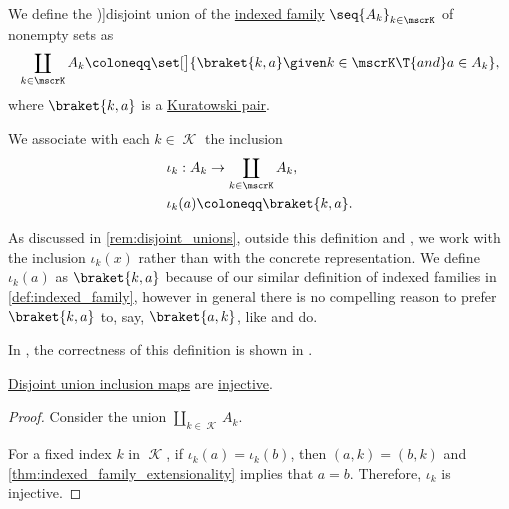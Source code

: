 \begin{definition}\label{def:disjoint_union}
  We define the \term[ru=дизъюнктное произведение, en=disjoint union (\cite[198]{Knapp2016BasicAlgebra})]{disjoint union} of the \hyperref[def:indexed_family]{indexed family} \( \seq{ A_k }_{k \in \mscrK} \) of nonempty sets as
  \begin{equation*}
    \coprod_{k \in \mscrK} A_k \coloneqq \set[\big]{ \braket{ k, a } \given k \in \mscrK \T{and} a \in A_k },
  \end{equation*}
  where \( \braket{ k, a } \) is a \hyperref[def:kuratowski_pair]{Kuratowski pair}.

  We associate with each \( k \in \mscrK \) the inclusion
  \begin{equation*}
    \begin{aligned}
      &\iota_k: A_k \to \coprod_{k \in \mscrK} A_k, \\
      &\iota_k(a) \coloneqq \braket{ k, a }.
    \end{aligned}
  \end{equation*}
\end{definition}
\begin{comments}
  \item As discussed in \cref{rem:disjoint_unions}, outside this definition and , we work with the inclusion \( \iota_k(x) \) rather than with the concrete representation. We define \( \iota_k(a) \) as \( \braket{ k, a } \) because of our similar definition of indexed families in \cref{def:indexed_family}, however in general there is no compelling reason to prefer \( \braket{ k, a } \) to, say, \( \braket{ a, k } \), like \cite[19]{Хелемский2014ФункциональныйАнализ} and \cite[198]{Knapp2016BasicAlgebra} do.

  \item In \hyperref[def:zfc]{}, the correctness of this definition is shown in .
\end{comments}

\begin{proposition}\label{thm:disjoint_product_inclusions_injective}
  \hyperref[def:disjoint_union]{Disjoint union inclusion maps} are \hyperref[def:function_invertibility/injective]{injective}.
\end{proposition}
\begin{proof}
  Consider the union \( \coprod_{k \in \mscrK} A_k \).

  For a fixed index \( k \) in \( \mscrK \), if \( \iota_k(a) = \iota_k(b) \), then \( (a, k) = (b, k) \) and \cref{thm:indexed_family_extensionality} implies that \( a = b \). Therefore, \( \iota_k \) is injective.
\end{proof}

